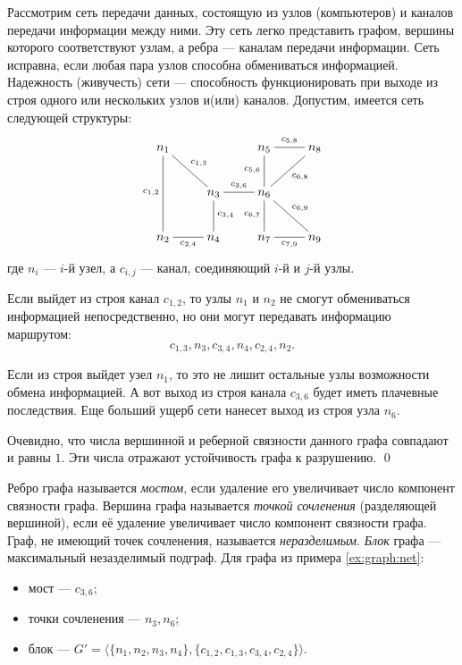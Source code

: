 \begin{exampl}
    \label{ex:graph:net}
    Рассмотрим сеть передачи данных, состоящую из узлов (компьютеров) и каналов передачи информации между ними. Эту сеть легко представить графом, вершины которого соответствуют узлам, а ребра --- каналам передачи информации. Сеть исправна, если любая пара узлов способна обмениваться информацией. Надежность (живучесть) сети --- способность функционировать при выходе из строя одного или нескольких узлов и(или) каналов. Допустим, имеется сеть следующей структуры:
    \[
        {\xymatrix{
            n_1 \ar@{-}[dd]_{c_{1,2}} \ar@{-}[dr]^{c_{1,3}}
                &*{}
                    &n_5 \ar@{-}[d]_{c_{5,6}} \ar@{-}[r]^{c_{5,8}}
                        &n_8
                            \\
            *{}
                &n_3 \ar@{-}[d]^{c_{3,4}} \ar@{-}[r]^{c_{3,6}}
                    &n_6 \ar@{-}[ur]_{c_{6,8}} \ar@{-}[dr]^{c_{6,9}} \ar@{-}[d]_{c_{6,7}}
                        &*{}
                            \\
            n_2 \ar@{-}[r]_{c_{2,4}}
                &n_4
                    &n_7 \ar@{-}[r]_{c_{7,9}}
                        &n_9
                            \\
        }}
    \]
    где $n_i$ --- $i$-й узел, а $c_{i,j}$ --- канал, соединяющий $i$-й и $j$-й узлы.
    
    Если выйдет из строя канал $c_{1,2}$, то узлы $n_1$ и $n_2$ не смогут обмениваться информацией непосредственно, но они могут передавать информацию маршрутом: 
    \[c_{1,3},n_3,c_{3,4},n_4,c_{2,4},n_2.\]
    
    Если из строя выйдет узел $n_1$, то это не лишит остальные узлы возможности обмена информацией. А вот выход из строя канала $c_{3,6}$ будет иметь плачевные последствия. Еще больший ущерб сети нанесет выход из строя узла $n_6$.
    
    Очевидно, что числа вершинной и реберной связности данного графа совпадают и равны $1$. Эти числа отражают устойчивость графа к разрушению.
    \qed
\end{exampl}

Ребро графа называется \emph{мостом}, если удаление его увеличивает число компонент связности графа. Вершина графа называется \emph{точкой сочленения} (разделяющей вершиной), если её удаление увеличивает число компонент связности графа. Граф, не имеющий точек сочленения, называется \emph{неразделимым}. \emph{Блок} графа --- максимальный незазделимый подграф. Для графа из примера \ref{ex:graph:net}:
\begin{itemize}
    \item мост --- $c_{3,6}$;
    \item точки сочленения --- $n_3,n_6$;
    \item блок --- $G'=\langle\{n_1,n_2,n_3,n_4\},\{c_{1,2},c_{1,3},c_{3,4},c_{2,4}\}\rangle$.
\end{itemize}

